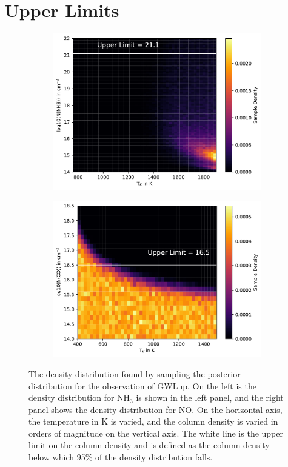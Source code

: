 \documentclass[oneside, single, authoryear, semicolon, 12pt]{lion-msc}
\newcommand{\4}{$_4$}
\newcommand{\3}{$_3$}
\newcommand{\2}{$_2$}
\begin{document}
\chapter{Upper Limits}
\begin{figure}[!ht]
    \centering
    \begin{subfigure}[b]{0.49\textwidth}
        \centering
        \includegraphics[width=\textwidth]{radexpy_niels/Radexpy_for_Niels/upper_NH3_GWLup.pdf}
    \end{subfigure}
    \hfill
    \begin{subfigure}[b]{0.49\textwidth}
        \centering
        \includegraphics[width=\textwidth]{upper_CO_GWLup.pdf}
    \end{subfigure}
    \caption{The density distribution found by sampling the posterior distribution for the observation of GWLup. On the left is the density distribution for NH\3 is shown in the left panel, and the right panel shows the density distribution for NO. On the horizontal axis, the temperature in K is varied, and the column density is varied in orders of magnitude on the vertical axis. The white line is the upper limit on the column density and is defined as the column density below which 95\% of the density distribution falls.}
\end{figure}
\end{document}
